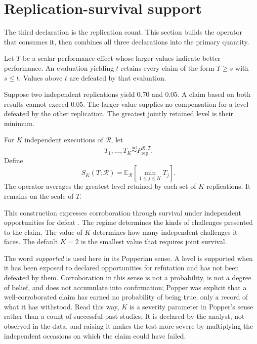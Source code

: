 \documentclass[11pt]{article}
\newcommand{\Regime}{\mathcal{R}}
\newcommand{\E}{\mathbb{E}}
\newcommand{\iid}{\mathrel{\overset{\mathrm{iid}}{\sim}}}
\theoremstyle{remark}
\begin{document}
\section{Replication-survival support}
\label{sec:support}

The third declaration is the replication count. This section builds the operator that consumes it, then combines all three declarations into the primary quantity.

Let $T$ be a scalar performance effect whose larger values indicate better performance. An evaluation yielding $t$ retains every claim of the form $T\geq s$ with $s\leq t$. Values above $t$ are defeated by that evaluation.

Suppose two independent replications yield $0.70$ and $0.05$. A claim based on both results cannot exceed $0.05$. The larger value supplies no compensation for a level defeated by the other replication. The greatest jointly retained level is their minimum.

For $K$ independent executions of $\Regime$, let
\[
T_1,\ldots,T_K
\iid
P_{\mathrm{rep}}^{\Regime,T}.
\]
Define
\begin{equation}
S_K(T;\Regime)
=
\E_{\Regime}
\left[
\min_{1\leq j\leq K}T_j
\right].
\label{eq:support-operator}
\end{equation}
The operator averages the greatest level retained by each set of $K$ replications. It remains on the scale of $T$.

This construction expresses corroboration through survival under independent opportunities for defeat \cite{popper1959logic}. The regime determines the kinds of challenges presented to the claim. The value of $K$ determines how many independent challenges it faces. The default $K=2$ is the smallest value that requires joint survival.

The word \emph{supported} is used here in its Popperian sense. A level is supported when it has been exposed to declared opportunities for refutation and has not been defeated by them. Corroboration in this sense is not a probability, is not a degree of belief, and does not accumulate into confirmation; Popper was explicit that a well-corroborated claim has earned no probability of being true, only a record of what it has withstood. Read this way, $K$ is a severity parameter in Popper's sense rather than a count of successful past studies. It is declared by the analyst, not observed in the data, and raising it makes the test more severe by multiplying the independent occasions on which the claim could have failed.
\end{document}

